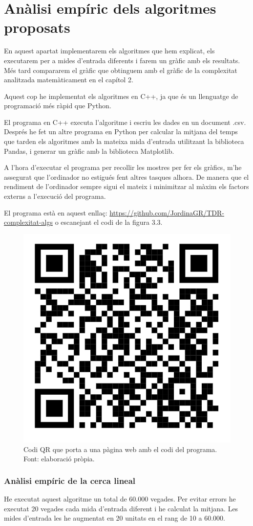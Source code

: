 \section{Anàlisi empíric dels algoritmes proposats}
En aquest apartat implementarem els algoritmes que hem explicat, els executarem per a mides d'entrada diferents i farem un gràfic amb els resultats. Més tard compararem el gràfic que obtinguem amb el gràfic de la complexitat analitzada matemàticament en el capítol 2.

Aquest cop he implementat els algoritmes en C++, ja que és un llenguatge de programació més ràpid que Python. 

El programa en C++ executa l'algoritme i escriu les dades en un document .csv. Després he fet un altre programa en Python per calcular la mitjana del temps que tarden els algoritmes amb la mateixa mida d'entrada utilitzant la biblioteca Pandas, i generar un gràfic amb la biblioteca Matplotlib.

A l'hora d'executar el programa per recollir les mostres per fer els gràfics, m'he assegurat que l'ordinador no estigués fent altres tasques alhora. De manera que el rendiment de l'ordinador sempre sigui el mateix i minimitzar al màxim els factors externs a l'execució del programa.

El programa està en aquest enllaç: \url{https://github.com/JordinaGR/TDR-complexitat-algs} o escanejant el codi de la figura 3.3.

\begin{figure}[H]
    \centering
    \includegraphics[width=.15\textwidth]{capitols/figures/qralgs_complex.png}
    \caption[Codi QR que porta a una pàgina web amb el codi del programa]{Codi QR que porta a una pàgina web amb el codi del programa. Font: elaboració pròpia.}
    \label{fig:my_label}
\end{figure}

\subsubsection{Anàlisi empíric de la cerca lineal}
He executat aquest algoritme un total de 60.000 vegades. Per evitar errors he executat 20 vegades cada mida d'entrada diferent i he calculat la mitjana. Les mides d'entrada les he augmentat en 20 unitats en el rang de 10 a 60.000.

